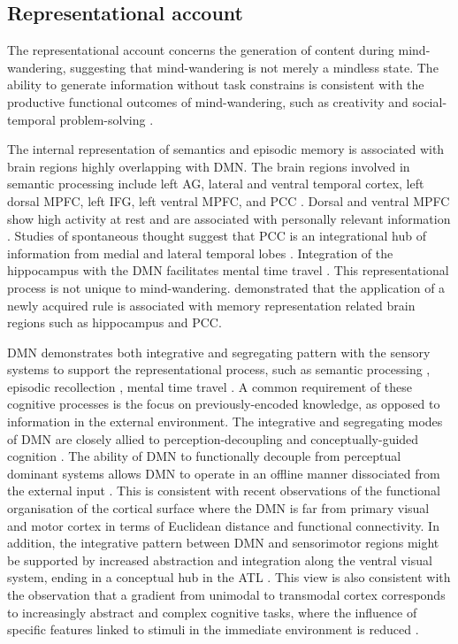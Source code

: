 \subsection{Representational account}

The representational account concerns the generation of content during mind-wandering, suggesting that mind-wandering is not merely a mindless state. The ability to generate information without task constrains is consistent with the productive functional outcomes of mind-wandering, such as creativity \cite{Baird2012,Smeekens2016} and social-temporal problem-solving \cite{RubyPlos2013,PoerioFrontiers2016,Medea2016}. 

The internal representation of semantics and episodic memory is associated with brain regions highly overlapping with DMN. The brain regions involved in semantic processing include left AG, lateral and ventral temporal cortex, left dorsal MPFC, left IFG, left ventral MPFC, and PCC \cite{Binder2009,Lambon-Ralph2017}. Dorsal and ventral MPFC show high activity at rest and are associated with personally relevant information \cite{Gusnard2001}. Studies of spontaneous thought suggest that PCC is an integrational hub of information from medial and lateral temporal lobes \cite{Smallwood2016}. Integration of the hippocampus with the DMN facilitates mental time travel \cite{Karapanagiotidis2017}. This representational process is not unique to mind-wandering.  demonstrated that the application of a newly acquired rule is associated with memory representation related brain regions such as hippocampus and PCC. 

DMN demonstrates both integrative and segregating pattern with the sensory systems to support the representational process, such as semantic processing \cite{Binder2009,Krieger-Redwood2016}, episodic recollection \cite{Rugg2013}, mental time travel \cite{Schacter2007}. A common requirement of these cognitive processes is the focus on previously-encoded knowledge, as opposed to information in the external environment.
The integrative and segregating modes of DMN are closely allied to perception-decoupling and conceptually-guided cognition \cite{Murphy2018}. 
The ability of DMN to functionally decouple from perceptual dominant systems allows DMN to operate in an offline manner dissociated from the external input \cite{Smallwood2013}. This is consistent with recent observations of the functional organisation of the cortical surface \cite{Margulies2016} where the DMN is far from primary visual and motor cortex in terms of Euclidean distance and functional connectivity. 
In addition, the integrative pattern between DMN and sensorimotor regions might be supported by increased abstraction and integration along the ventral visual system, ending in a conceptual hub in the ATL \cite{Lambon-Ralph2017}. 
This view is also consistent with the observation that a gradient from unimodal to transmodal cortex \cite{Margulies2016} corresponds to increasingly abstract and complex cognitive tasks, where the influence of specific features linked to stimuli in the immediate environment is reduced \cite{Mesulam1998,Buckner2013,Margulies2016}.

